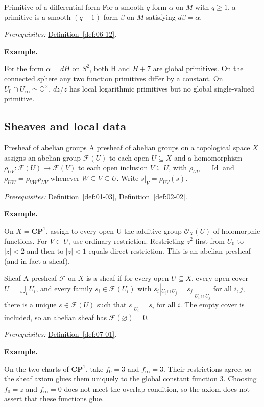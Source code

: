\documentclass[11pt]{article}
\makeatletter
\newcommand{\C}{\mathbb C}
\newcommand{\id}{\operatorname{Id}}
\newcounter{definition}
\newcommand{\CP}{\mathbf{CP}}
\newcommand{\exampleheading}{\par\medskip\textbf{Example.}\par\smallskip}
\newcommand{\currentdefinition}[1]{\protected@edef\@currentlabel{#1}}
\makeatother
\begin{document}
\begin{definitionbox}{Primitive of a differential form}
\currentdefinition{\thedefinition}
\label{def:06-13}
For a smooth $q$-form $\alpha$ on $M$ with $q\ge1$, a primitive is a smooth $(q-1)$-form $\beta$ on $M$ satisfying $d\beta=\alpha$.

\smallskip
\textit{Prerequisites:} \hyperref[def:06-12]{Definition~\ref*{def:06-12}}.

\exampleheading
For the form $\alpha=dH$ on $S^2$, both H and $H+7$ are global primitives. On the connected sphere any two function primitives differ by a constant. On $U_0\cap U_\infty\simeq\C^\times$, $dz/z$ has local logarithmic primitives but no global single-valued primitive.
\end{definitionbox}

\subsection*{Sheaves and local data}

\begin{definitionbox}{Presheaf of abelian groups}
\currentdefinition{\thedefinition}
\label{def:07-01}
A presheaf of abelian groups on a topological space $X$ assigns an abelian group $\mathcal F(U)$ to each open $U\subseteq X$ and a homomorphism $\rho_{UV}:\mathcal F(U)\to\mathcal F(V)$ to each open inclusion $V\subseteq U$, with $\rho_{UU}=\id$ and $\rho_{UW}=\rho_{VW}\rho_{UV}$ whenever $W\subseteq V\subseteq U$. Write $s|_V=\rho_{UV}(s)$.

\smallskip
\textit{Prerequisites:} \hyperref[def:01-03]{Definition~\ref*{def:01-03}}, \hyperref[def:02-02]{Definition~\ref*{def:02-02}}.

\exampleheading
On $X=\CP^1$, assign to every open U the additive group $\mathcal O_X(U)$ of holomorphic functions. For $V\subset U$, use ordinary restriction. Restricting $z^2$ first from $U_0$ to $|z|<2$ and then to $|z|<1$ equals direct restriction. This is an abelian presheaf (and in fact a sheaf).
\end{definitionbox}

\begin{definitionbox}{Sheaf}
\currentdefinition{\thedefinition}
\label{def:08-01}
A presheaf $\mathcal F$ on $X$ is a sheaf if for every open $U\subseteq X$, every open cover $U=\bigcup_iU_i$, and every family $s_i\in\mathcal F(U_i)$ with $s_i|_{U_i\cap U_j}=s_j|_{U_i\cap U_j}$ for all $i,j$, there is a unique $s\in\mathcal F(U)$ such that $s|_{U_i}=s_i$ for all $i$. The empty cover is included, so an abelian sheaf has $\mathcal F(\varnothing)=0$.

\smallskip
\textit{Prerequisites:} \hyperref[def:07-01]{Definition~\ref*{def:07-01}}.

\exampleheading
On the two charts of $\CP^1$, take $f_0=3$ and $f_\infty=3$. Their restrictions agree, so the sheaf axiom glues them uniquely to the global constant function 3. Choosing $f_0=z$ and $f_\infty=0$ does not meet the overlap condition, so the axiom does not assert that these functions glue.
\end{definitionbox}
\end{document}
